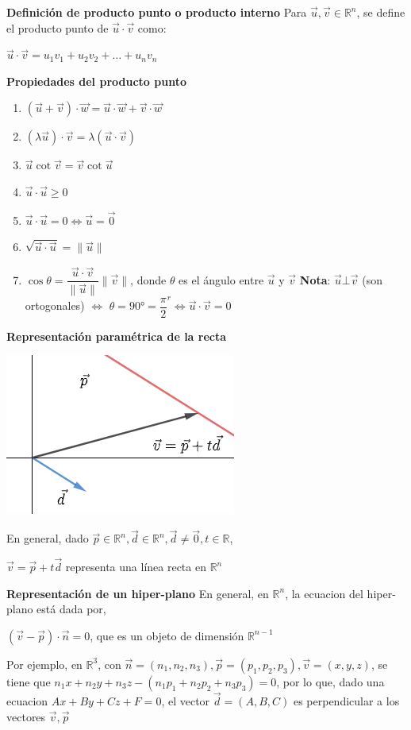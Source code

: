 \documentclass[12pt]{article}
\begin{document}
\noindent\textbf{Definición de producto punto o producto interno} \newline
Para  $\vec{u},\vec{v}\in\mathbb{R}^n$, se define el producto punto de $\vec{u}\cdot\vec{v}$ como:
\begin{center}
    $\vec{u}\cdot\vec{v}=u_1v_1+u_2v_2+\dots+u_nv_n$     
\end{center}
\textbf{Propiedades del producto punto}
\begin{enumerate}
     \item $\left(\vec{u}+\vec{v}\right)\cdot\vec{w} = \vec{u}\cdot\vec{w}+\vec{v}\cdot\vec{w}$
     \item $\left(\lambda\vec{u}\right)\cdot\vec{v}=\lambda\left(\vec{u}\cdot\vec{v}\right)$
     \item $\vec{u}\cot\vec{v}=\vec{v}\cot\vec{u}$
     \item $\vec{u}\cdot\vec{u}\geq0$
     \item $\vec{u}\cdot\vec{u}=0\Leftrightarrow\vec{u}=\vec{0}$
     \item $\sqrt{\vec{u}\cdot\vec{u}} = \|\vec{u}\|$
     \item $\cos{\theta}=\dfrac{\vec{u}\cdot\vec{v}}{\|\vec{u}\|}\|\vec{v}\|$, donde $\theta$ es el ángulo
     entre $\vec{u}$ y $\vec{v}$
     \newline
     \textbf{Nota}: $\vec{u}\bot\vec{v}$ (son ortogonales) 
     $\Leftrightarrow$ $\theta=90°=\dfrac{\pi}{2}^r\Leftrightarrow\vec{u}\cdot\vec{v}=0$
\end{enumerate}
\newpage
\noindent\textbf{Representación paramétrica de la recta}
\begin{center}
    \includegraphics{formaVec.png}
\end{center}
En general, dado $\vec{p}\in\mathbb{R}^n,\vec{d}\in\mathbb{R}^n, \vec{d}\not=\vec{0}, t\in\mathbb{R}$,
\begin{center}
    $\vec{v}=\vec{p}+t\vec{d}$ representa una línea recta en $\mathbb{R}^n$
\end{center}
\textbf{Representación de un hiper-plano}\newline
En general, en $\mathbb{R}^n$, la ecuacion del hiper-plano está dada por,
\begin{center}
    $\left(\vec{v}-\vec{p}\right)\cdot\vec{n}=0$, que es un objeto de dimensión $\mathbb{R}^{n-1}$
\end{center}
Por ejemplo, en $\mathbb{R}^3$, con $\vec{n}=(n_1,n_2,n_3), \vec{p}=(p_1,p_2,p_3), \vec{v}=(x,y,z)$, se tiene que $n_1x+n_2y+n_3z-(n_1p_1+n_2p_2+n_3p_3)=0$, 
por lo que, dado una ecuacion $Ax+By+Cz+F=0$, el vector $\vec{d}=(A,B,C)$ es perpendicular a los vectores $\vec{v}, \vec{p}$
\end{document}
